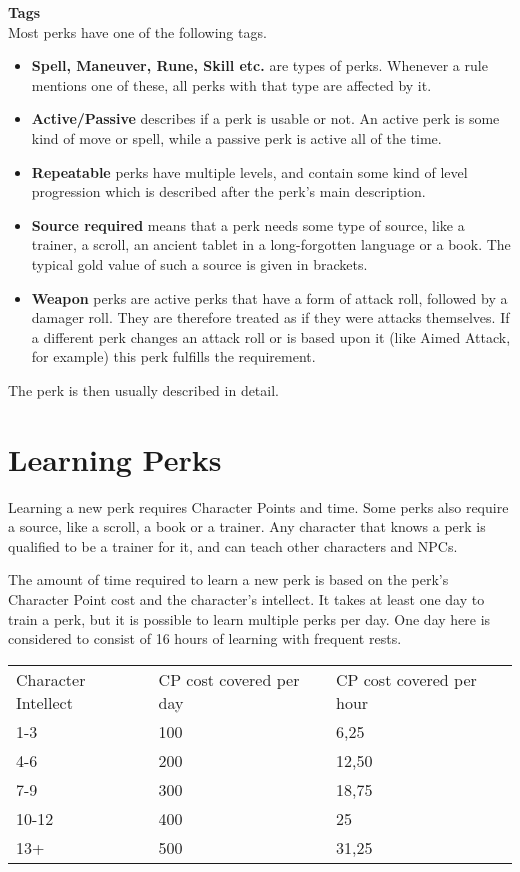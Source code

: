 \textbf{Tags}\\
Most perks have one of the following tags.\\
\begin{itemize}
	\item \textbf{Spell, Maneuver, Rune, Skill etc.} are types of perks. Whenever a rule mentions one of these, all perks with that type are affected by it.\\
	\item \textbf{Active/Passive} describes if a perk is usable or not. An active perk is some kind of move or spell, while a passive perk is active all of the time.\\
	\item \textbf{Repeatable} perks have multiple levels, and contain some kind of level progression which is described after the perk's main description.\\
	\item \textbf{Source required} means that a perk needs some type of source, like a trainer, a scroll, an ancient tablet in a long-forgotten language or a book. The typical gold value of such a source is given in brackets.\\
	\item \textbf{Weapon} perks are active perks that have a form of attack roll, followed by a damager roll. They are therefore treated as if they were attacks themselves. If a different perk changes an attack roll or is based upon it (like Aimed Attack, for example) this perk fulfills the requirement.\\
\end{itemize}

The perk is then usually described in detail.

\section{Learning Perks}
Learning a new perk requires Character Points and time. Some perks also require a source, like a scroll, a book or a trainer. Any character that knows a perk is qualified to be a trainer for it, and can teach other characters and NPCs. 

The amount of time required to learn a new perk is based on the perk's Character Point cost and the character's intellect. It takes at least one day to train a perk, but it is possible to learn multiple perks per day. One day here is considered to consist of 16 hours of learning with frequent rests.\\

\begin{tabular}{l | l | l}
	Character Intellect & CP cost covered per day & CP cost covered per hour\\
	1-3 & 100 & 6,25\\
	4-6 & 200 & 12,50\\
	7-9 & 300 & 18,75\\
	10-12 & 400 & 25\\
	13+ & 500 & 31,25
\end{tabular}
